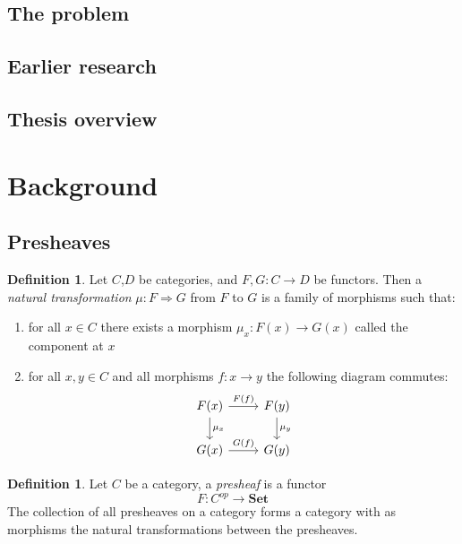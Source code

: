 \documentclass[12pt]{article}
\theoremstyle{definition}
\newtheorem{definition}[theorem]{Definition}
\newcommand{\1}{\mathbbm{1}}
\newcommand{\Set}{\mathbf{Set}}
\begin{document}
\subsection{The problem}

\subsection{Earlier research}

\subsection{Thesis overview}

\newpage
\section{Background}
\subsection{Presheaves}
\begin{definition}
    Let $C$,$D$ be categories, and $F,G: C\to D$ be functors. Then a \emph{natural transformation} $\mu: F\Rightarrow G$ from $F$ to $G$ is a family of morphisms such that:
    \begin{enumerate}
        \item for all $x\in C$ there exists a morphism $\mu_x: F(x)\to G(x)$ called the component at $x$
        \item for all $x,y\in C$ and all morphisms $f: x\to y$ the following diagram commutes:
        \begin{equation}\label{eq:nat-trans}
            \begin{tikzcd}
                F(x) \arrow{r}{F(f)} \arrow{d}{\mu_x} & F(y) \arrow{d}{\mu_y} \\
                G(x) \arrow{r}{G(f)} & G(y)
            \end{tikzcd}
        \end{equation}
    \end{enumerate}
\end{definition}

\begin{definition}
    Let $C$ be a category, a \emph{presheaf} is a functor \[
        F: C^{op}\to \Set
    \]
    The collection of all presheaves on a category forms a category with as morphisms the natural transformations between the presheaves.
\end{definition}
\end{document}
